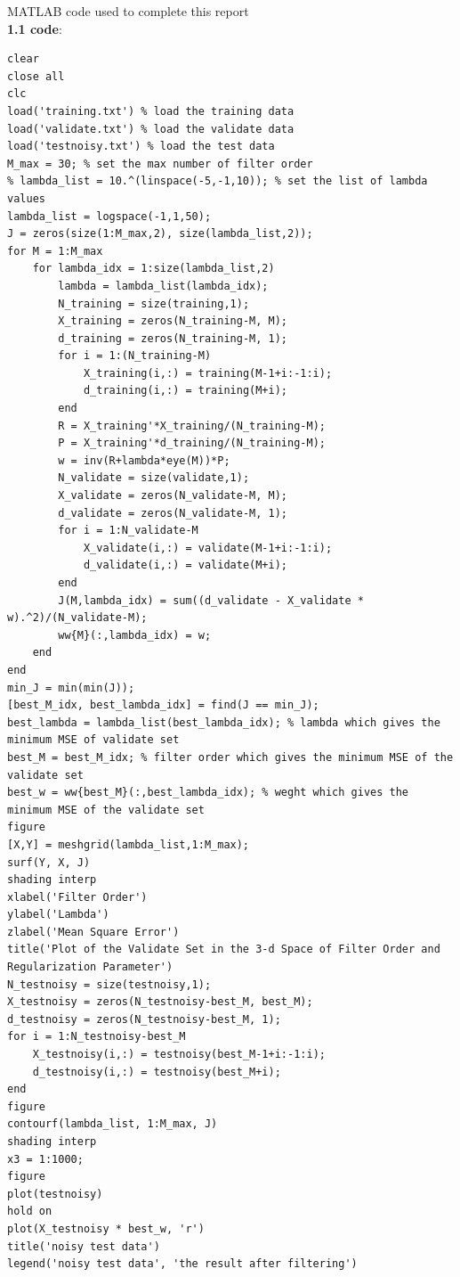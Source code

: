 \documentclass[a4paper]{article}
\begin{document}
\begin{spacing}{2.0}
\newpage
\huge{MATLAB code used to complete this report\\}
\normalsize
\textbf{1.1 code}:
\begin{lstlisting}
clear
close all
clc
load('training.txt') % load the training data
load('validate.txt') % load the validate data
load('testnoisy.txt') % load the test data
M_max = 30; % set the max number of filter order
% lambda_list = 10.^(linspace(-5,-1,10)); % set the list of lambda values
lambda_list = logspace(-1,1,50);
J = zeros(size(1:M_max,2), size(lambda_list,2));
for M = 1:M_max
    for lambda_idx = 1:size(lambda_list,2)
        lambda = lambda_list(lambda_idx);
        N_training = size(training,1);
        X_training = zeros(N_training-M, M);
        d_training = zeros(N_training-M, 1);
        for i = 1:(N_training-M)
            X_training(i,:) = training(M-1+i:-1:i);
            d_training(i,:) = training(M+i);
        end
        R = X_training'*X_training/(N_training-M);
        P = X_training'*d_training/(N_training-M);
        w = inv(R+lambda*eye(M))*P;       
        N_validate = size(validate,1);
        X_validate = zeros(N_validate-M, M);
        d_validate = zeros(N_validate-M, 1);
        for i = 1:N_validate-M
            X_validate(i,:) = validate(M-1+i:-1:i);
            d_validate(i,:) = validate(M+i);
        end
        J(M,lambda_idx) = sum((d_validate - X_validate * w).^2)/(N_validate-M);
        ww{M}(:,lambda_idx) = w;
    end
end
min_J = min(min(J));
[best_M_idx, best_lambda_idx] = find(J == min_J);
best_lambda = lambda_list(best_lambda_idx); % lambda which gives the minimum MSE of validate set
best_M = best_M_idx; % filter order which gives the minimum MSE of the validate set
best_w = ww{best_M}(:,best_lambda_idx); % weght which gives the minimum MSE of the validate set
figure
[X,Y] = meshgrid(lambda_list,1:M_max); 
surf(Y, X, J)
shading interp
xlabel('Filter Order')
ylabel('Lambda')
zlabel('Mean Square Error')
title('Plot of the Validate Set in the 3-d Space of Filter Order and Regularization Parameter')
N_testnoisy = size(testnoisy,1);
X_testnoisy = zeros(N_testnoisy-best_M, best_M);
d_testnoisy = zeros(N_testnoisy-best_M, 1);
for i = 1:N_testnoisy-best_M
    X_testnoisy(i,:) = testnoisy(best_M-1+i:-1:i);
	d_testnoisy(i,:) = testnoisy(best_M+i);
end
figure
contourf(lambda_list, 1:M_max, J)
shading interp
x3 = 1:1000;
figure
plot(testnoisy)
hold on
plot(X_testnoisy * best_w, 'r')
title('noisy test data')
legend('noisy test data', 'the result after filtering')
\end{lstlisting}


\end{spacing}
\end{document}
